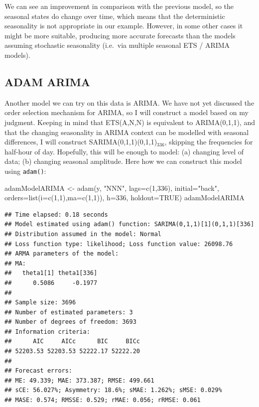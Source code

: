 \documentclass[
]{book}
\newenvironment{Shaded}{\begin{snugshade}}{\end{snugshade}}
\newcommand{\AttributeTok}[1]{\textcolor[rgb]{0.77,0.63,0.00}{#1}}
\newcommand{\ConstantTok}[1]{\textcolor[rgb]{0.00,0.00,0.00}{#1}}
\newcommand{\DecValTok}[1]{\textcolor[rgb]{0.00,0.00,0.81}{#1}}
\newcommand{\FunctionTok}[1]{\textcolor[rgb]{0.00,0.00,0.00}{#1}}
\newcommand{\NormalTok}[1]{#1}
\newcommand{\OtherTok}[1]{\textcolor[rgb]{0.56,0.35,0.01}{#1}}
\newcommand{\StringTok}[1]{\textcolor[rgb]{0.31,0.60,0.02}{#1}}
\theoremstyle{definition}
\theoremstyle{definition}
\theoremstyle{definition}
\theoremstyle{definition}
\theoremstyle{remark}
\begin{document}
We can see an improvement in comparison with the previous model, so the seasonal states do change over time, which means that the deterministic seasonality is not appropriate in our example. However, in some other cases it might be more suitable, producing more accurate forecasts than the models assuming stochastic seasonality (i.e.~via multiple seasonal ETS / ARIMA models).

\hypertarget{adam-arima}{%
\subsection{ADAM ARIMA}\label{adam-arima}}

Another model we can try on this data is ARIMA. We have not yet discussed the order selection mechanism for ARIMA, so I will construct a model based on my judgment. Keeping in mind that ETS(A,N,N) is equivalent to ARIMA(0,1,1), and that the changing seasonality in ARIMA context can be modelled with seasonal differences, I will construct SARIMA(0,1,1)(0,1,1)\(_{336}\), skipping the frequencies for half-hour of day. Hopefully, this will be enough to model: (a) changing level of data; (b) changing seasonal amplitude. Here how we can construct this model using \texttt{adam()}:

\begin{Shaded}
\begin{Highlighting}[]
\NormalTok{adamModelARIMA }\OtherTok{\textless{}{-}} \FunctionTok{adam}\NormalTok{(y, }\StringTok{"NNN"}\NormalTok{, }\AttributeTok{lags=}\FunctionTok{c}\NormalTok{(}\DecValTok{1}\NormalTok{,}\DecValTok{336}\NormalTok{), }\AttributeTok{initial=}\StringTok{"back"}\NormalTok{,}
                       \AttributeTok{orders=}\FunctionTok{list}\NormalTok{(}\AttributeTok{i=}\FunctionTok{c}\NormalTok{(}\DecValTok{1}\NormalTok{,}\DecValTok{1}\NormalTok{),}\AttributeTok{ma=}\FunctionTok{c}\NormalTok{(}\DecValTok{1}\NormalTok{,}\DecValTok{1}\NormalTok{)),}
                       \AttributeTok{h=}\DecValTok{336}\NormalTok{, }\AttributeTok{holdout=}\ConstantTok{TRUE}\NormalTok{)}
\NormalTok{adamModelARIMA}
\end{Highlighting}
\end{Shaded}

\begin{verbatim}
## Time elapsed: 0.18 seconds
## Model estimated using adam() function: SARIMA(0,1,1)[1](0,1,1)[336]
## Distribution assumed in the model: Normal
## Loss function type: likelihood; Loss function value: 26098.76
## ARMA parameters of the model:
## MA:
##   theta1[1] theta1[336] 
##      0.5086     -0.1977 
## 
## Sample size: 3696
## Number of estimated parameters: 3
## Number of degrees of freedom: 3693
## Information criteria:
##      AIC     AICc      BIC     BICc 
## 52203.53 52203.53 52222.17 52222.20 
## 
## Forecast errors:
## ME: 49.339; MAE: 373.387; RMSE: 499.661
## sCE: 56.027%; Asymmetry: 18.6%; sMAE: 1.262%; sMSE: 0.029%
## MASE: 0.574; RMSSE: 0.529; rMAE: 0.056; rRMSE: 0.061
\end{verbatim}
\end{document}
